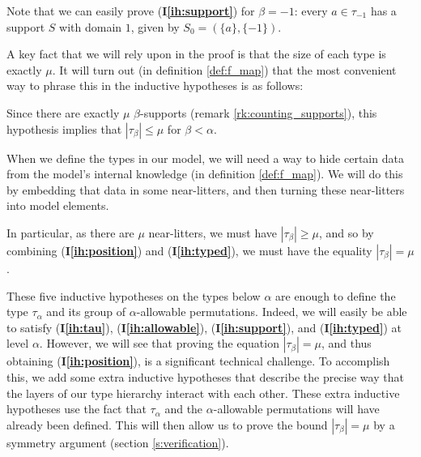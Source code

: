 \documentclass{article}
\theoremstyle{definition}
\theoremstyle{remark}
\newcommand{\ihref}[1]{(\textbf{I\ref{#1}})}
\begin{document}
{

Note that we can easily prove \ihref{ih:support} for $\beta = -1$: every $a \in \tau_{-1}$ has a support $S$ with domain $1$, given by $S_0 = (\{a\}, \{-1\})$.

A key fact that we will rely upon in the proof is that the size of each type is exactly $\mu$.
It will turn out (in definition \ref{def:f_map}) that the most convenient way to phrase this in the inductive hypotheses is as follows:


Since there are exactly $\mu$ $\beta$-supports (remark \ref{rk:counting_supports}), this hypothesis implies that $|\tau_\beta| \leq \mu$ for $\beta < \alpha$.

When we define the types in our model, we will need a way to hide certain data from the model's internal knowledge (in definition \ref{def:f_map}).
We will do this by embedding that data in some near-litters, and then turning these near-litters into model elements.


In particular, as there are $\mu$ near-litters, we must have $|\tau_\beta| \geq \mu$, and so by combining \ihref{ih:position} and \ihref{ih:typed}, we must have the equality $|\tau_\beta| = \mu$.

These five inductive hypotheses on the types below $\alpha$ are enough to define the type $\tau_\alpha$ and its group of $\alpha$-allowable permutations.
Indeed, we will easily be able to satisfy \ihref{ih:tau}, \ihref{ih:allowable}, \ihref{ih:support}, and \ihref{ih:typed} at level $\alpha$.
However, we will see that proving the equation $|\tau_\beta| = \mu$, and thus obtaining \ihref{ih:position}, is a significant technical challenge.
To accomplish this, we add some extra inductive hypotheses that describe the precise way that the layers of our type hierarchy interact with each other.
These extra inductive hypotheses use the fact that $\tau_\alpha$ and the $\alpha$-allowable permutations will have already been defined.
This will then allow us to prove the bound $|\tau_\beta| = \mu$ by a symmetry argument (section \ref{s:verification}).

}
\end{document}
